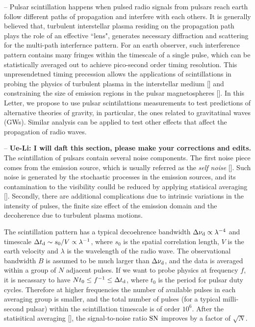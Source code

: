 \documentclass[prl,aps,floatfix,superscriptaddress,twocolumn]{revtex4}
\begin{document}
 -- Pulsar scintillation happens when pulsed radio signals from pulsars reach earth follow different paths of propagation and interfere with each others. It is generally believed that, turbulent interstellar plasma residing on the propagation path plays the role of an effective ``lens", generates necessary diffraction and scattering for the multi-path interfernce pattern. For an earth observer, such interference pattern contains many fringes within the timescale of a single pulse, which can be statistically averaged out to achieve pico-second order timing resolution. 
This unpresendetned timing precession allows the applications of scintillations in probing the physics of turbulent plasma in the interstellar medium [] and constraining the size of emission regions in the pulsar magnetospheres []. In this Letter, we propose to use pulsar scintilattions measurements to test predictions of alternative theories of gravity, in particular, the ones related to gravitatinal waves (GWs). Similar analysis can be applied to test other effects that affect the propagation of radio waves.

 -- {\bf Ue-Li: I will daft this section, please make your corrections and edits.} The scintillation of pulsars contain several noise components. The first noise piece comes from the emission source, which is usually referred as the {\it self noise} []. Such noise is generated by the stochastic processes in the emission sources, and its contamination to the visibility coulld be reduced by applying statisical averaging []. Secondly, there are additional complications due to intrinsic variations in the intensity of pulses, the finite size effect of the emission domain and the decoherence due to turbulent plasma motions.

The scintillation pattern has a typical decoehrence bandwidth $\Delta \nu_{\rm d} \propto \lambda^{-4}$ and  timescale $\Delta t_{\rm d} \sim s_0/V \propto \lambda^{-1}$, where $s_0$ is the spatial correlation length, $V$ is the earth velocity and $\lambda$ is the wavelength of the radio wave. The observational bandwidth $B$ is assumed to be much larger than $\Delta \nu_{\rm d}$, and the data is averaged within a group of $N$ adjacent pulses. If we want to probe physics at frequency $f$, it is necassary to have $N t_0 \le f^{-1} \le \Delta t_{\rm d}$, where $t_0$ is the period for pulsar duty cycles.   Therefore at higher frequencies the number of available pulses in each averaging group is smaller, and the total number of pulses (for a typical milli-second pulsar) within the scintillation timescale is of order $10^6$. After the statisitical averaging [], the signal-to-noise ratio ${\rm SN}$ improves by a factor of $\sqrt{N}$.
\end{document}
